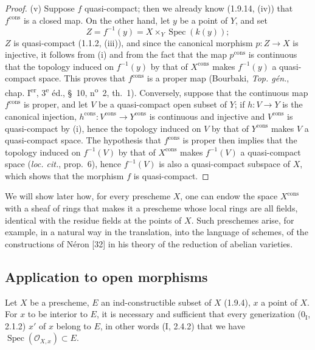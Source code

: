 \begin{proof}
(v) Suppose $f$ quasi-compact; then we already know (1.9.14, (iv)) that
$f^{\mathrm{cons}}$ is a closed map. On the other hand, let $y$ be a
point of $Y$, and set
\[
  Z=f^{-1}(y)=X\times_Y\operatorname{Spec}(k(y));
\]
$Z$ is quasi-compact (1.1.2, (iii)), and since the canonical morphism
$p:Z\to X$ is injective, it follows from (i) and from the fact that the map
$p^{\mathrm{cons}}$ is continuous that the topology induced on $f^{-1}(y)$
by that of $X^{\mathrm{cons}}$ makes $f^{-1}(y)$ a quasi-compact space.
This proves that $f^{\mathrm{cons}}$ is a proper map (Bourbaki,
\emph{Top. gén.}, chap. I\textsuperscript{er}, 3\textsuperscript{e} éd.,
\S~10, n\textsuperscript{o}~2, th.~1). Conversely, suppose that
the continuous map $f^{\mathrm{cons}}$ is proper, and let $V$ be a
quasi-compact open subset of $Y$; if $h:V\to Y$ is the canonical injection,
$h^{\mathrm{cons}}:V^{\mathrm{cons}}\to Y^{\mathrm{cons}}$ is continuous and
injective and $V^{\mathrm{cons}}$ is quasi-compact by (i), hence the topology
induced on $V$ by that of $Y^{\mathrm{cons}}$ makes $V$ a
quasi-compact space. The hypothesis that $f^{\mathrm{cons}}$ is proper then
implies that the topology induced on $f^{-1}(V)$ by that of
$X^{\mathrm{cons}}$ makes $f^{-1}(V)$ a quasi-compact space
(\emph{loc. cit.}, prop.~6), hence $f^{-1}(V)$ is also a quasi-compact
subspace of $X$, which shows that the morphism $f$ is quasi-compact.
\end{proof}

\begin{env}[1.9.16]
\label{IV.1.9.16}
We will show later how, for every prescheme $X$, one can endow the space
$X^{\mathrm{cons}}$ with a sheaf of rings that makes it a prescheme
whose local rings are all fields, identical with the residue fields at the
points of $X$. Such preschemes arise, for example, in a natural way in the
translation, into the language of schemes, of the constructions of
Néron [32] in his theory of the reduction of abelian varieties.
\end{env}


\subsection{Application to open morphisms}
\label{subsection:IV.1.10}

\begin{theorem}[1.10.1]
\label{IV.1.10.1}
Let $X$ be a prescheme, $E$ an ind-constructible subset of $X$ (1.9.4), $x$
a point of $X$. For $x$ to be interior to $E$, it is necessary and
sufficient that every generization ($0_{\mathrm I}$, 2.1.2) $x'$ of $x$
belong to $E$, in other words (I, 2.4.2) that we have
$\operatorname{Spec}(\mathcal O_{X,x})\subset E$.
\end{theorem}

